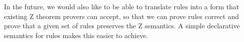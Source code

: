 \documentclass{entcs}
\begin{document}
In the future, we would also like to be able to translate rules
into a form that existing Z theorem provers can accept, so that we can prove
rules correct and prove that a given set of rules preserves the Z
semantics.  A simple declarative semantics for rules makes this
easier to achieve.



\end{document}
